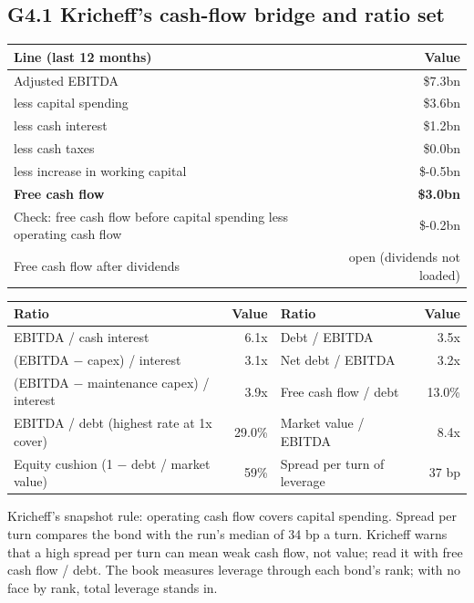 \documentclass[11pt,a4paper]{article}
\begin{document}
\subsection*{G4.1 Kricheff's cash-flow bridge and ratio set}
\begin{center}\footnotesize\setlength{\tabcolsep}{3.5pt}\begin{tabular}{@{}lr@{}}\toprule
Line (last 12 months) & Value \\\midrule
Adjusted EBITDA & \$7.3bn \\
less capital spending & \$3.6bn \\
less cash interest & \$1.2bn \\
less cash taxes & \$0.0bn \\
less increase in working capital & \$-0.5bn \\
\textbf{Free cash flow} & \textbf{\$3.0bn} \\
Check: free cash flow before capital spending less operating cash flow & \$-0.2bn \\
Free cash flow after dividends & open (dividends not loaded) \\
\bottomrule\end{tabular}\end{center}
\begin{center}\footnotesize\setlength{\tabcolsep}{3.5pt}\begin{tabular}{@{}lrlr@{}}\toprule
Ratio & Value & Ratio & Value \\\midrule
EBITDA / cash interest & 6.1x & Debt / EBITDA & 3.5x \\
(EBITDA $-$ capex) / interest & 3.1x & Net debt / EBITDA & 3.2x \\
(EBITDA $-$ maintenance capex) / interest & 3.9x & Free cash flow / debt & 13.0\% \\
EBITDA / debt (highest rate at 1x cover) & 29.0\% & Market value / EBITDA & 8.4x \\
Equity cushion (1 $-$ debt / market value) & 59\% & Spread per turn of leverage & 37 bp \\
\bottomrule\end{tabular}\end{center}
Kricheff's snapshot rule: operating cash flow covers capital spending. Spread per turn compares the bond with the run's median of 34 bp a turn. Kricheff warns that a high spread per turn can mean weak cash flow, not value; read it with free cash flow / debt. The book measures leverage through each bond's rank; with no face by rank, total leverage stands in.
\end{document}
